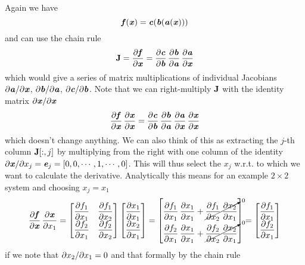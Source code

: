 \documentclass[paper=a4,11pt,headsepline]{scrartcl}
\begin{document}
Again we have
\begin{equation*}
    \ve f(\ve x) = \ve c(\ve b(\ve a(\ve x)))
\end{equation*}
and can use the chain rule
\begin{equation*}
    \ma J=\pd{\ve f}{\ve x} = \pd{\ve c}{\ve b}\,\pd{\ve b}{\ve a}\,\pd{\ve a}{\ve x}
\end{equation*}
which would give a series of matrix multiplications of individual Jacobians $\pdi{\ve
a}{\ve x}$, $\pdi{\ve b}{\ve a}$, $\pdi{\ve c}{\ve b}$.
Note that we can right-multiply $\ma J$ with the identity
matrix $\pdi{\ve x}{\ve x}$
\begin{equation*}
    \pd{\ve f}{\ve x}\,\pd{\ve x}{\ve x} =
    \pd{\ve c}{\ve b}\,\pd{\ve b}{\ve a}\,\pd{\ve a}{\ve x}\,\pd{\ve x}{\ve x}
\end{equation*}
which doesn't change anything. We can also think of this as extracting the
$j$-th column $\ma J[:,j]$ by multiplying from the right with one column of the
identity $\partial\ve x/\partial x_j = \ve e_j = [0,0,\cdots,1,\cdots, 0]$.
This will thus select the $x_j$ w.r.t. to which we want to calculate the
derivative. Analytically this means for an example $2\times 2$ system and choosing
$x_j = x_1$
\begin{equation*}
    \pd{\ve f}{\ve x}\,\pd{\ve x}{x_1}=
    \begin{bmatrix}
        \pd{f_1}{x_1} & \pd{f_1}{x_2} \\
        \pd{f_2}{x_1} & \pd{f_2}{x_2} \\
    \end{bmatrix}
    \begin{bmatrix}
        \pd{x_1}{x_1} \\
        \pd{x_2}{x_1} \\
    \end{bmatrix}
    =
    \begin{bmatrix}
        \pd{f_1}{x_1}\,\pd{x_1}{x_1} + \cancelto{0}{\pd{f_1}{x_2}\,\pd{x_2}{x_1}} \\
        \pd{f_2}{x_1}\,\pd{x_1}{x_1} + \cancelto{0}{\pd{f_2}{x_2}\,\pd{x_2}{x_1}} \\
    \end{bmatrix}
    =
    \begin{bmatrix}
        \pd{f_1}{x_1} \\
        \pd{f_2}{x_1} \\
    \end{bmatrix}
\end{equation*}
if we note that $\pdi{x_2}{x_1}=0$ and that formally by the chain rule
\end{document}
